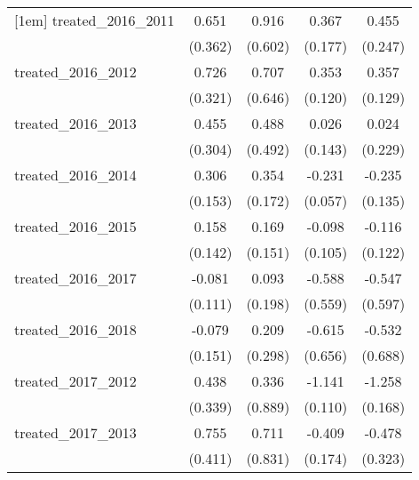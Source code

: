 {\begin{tabular}{l*{4}{c}}
[1em]
treated\_2016\_2011&       0.651         &       0.916         &       0.367\sym{*}  &       0.455         \\
            &     (0.362)         &     (0.602)         &     (0.177)         &     (0.247)         \\
[1em]
treated\_2016\_2012&       0.726\sym{*}  &       0.707         &       0.353\sym{**} &       0.357\sym{**} \\
            &     (0.321)         &     (0.646)         &     (0.120)         &     (0.129)         \\
[1em]
treated\_2016\_2013&       0.455         &       0.488         &       0.026         &       0.024         \\
            &     (0.304)         &     (0.492)         &     (0.143)         &     (0.229)         \\
[1em]
treated\_2016\_2014&       0.306\sym{*}  &       0.354\sym{*}  &      -0.231\sym{***}&      -0.235         \\
            &     (0.153)         &     (0.172)         &     (0.057)         &     (0.135)         \\
[1em]
treated\_2016\_2015&       0.158         &       0.169         &      -0.098         &      -0.116         \\
            &     (0.142)         &     (0.151)         &     (0.105)         &     (0.122)         \\
[1em]
treated\_2016\_2017&      -0.081         &       0.093         &      -0.588         &      -0.547         \\
            &     (0.111)         &     (0.198)         &     (0.559)         &     (0.597)         \\
[1em]
treated\_2016\_2018&      -0.079         &       0.209         &      -0.615         &      -0.532         \\
            &     (0.151)         &     (0.298)         &     (0.656)         &     (0.688)         \\
[1em]
treated\_2017\_2012&       0.438         &       0.336         &      -1.141\sym{***}&      -1.258\sym{***}\\
            &     (0.339)         &     (0.889)         &     (0.110)         &     (0.168)         \\
[1em]
treated\_2017\_2013&       0.755         &       0.711         &      -0.409\sym{*}  &      -0.478         \\
            &     (0.411)         &     (0.831)         &     (0.174)         &     (0.323)         \\

\end{tabular}}
